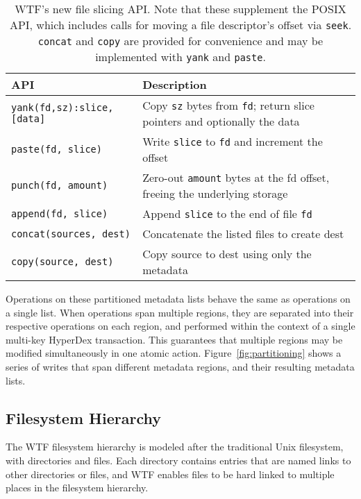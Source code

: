 \documentclass[twocolumn,10pt,letterpaper]{article}
\newcommand{\code}[1]{\texttt{#1}}
\newcommand\T{\rule{0pt}{2.6ex}}       \newcommand\B{\rule[-1.2ex]{0pt}{0pt}}
\begin{document}
\begin{table*}[t]
\centering
\begin{tabular}{ll}
\hline
\T\B API & Description \\
\hline
\T \code{yank(fd,sz):slice,[data]} & Copy \code{sz} bytes from \code{fd}; return
slice pointers and optionally the data \\
\code{paste(fd, slice)} & Write \code{slice} to \code{fd} and increment the
offset\\
\code{punch(fd, amount)} & Zero-out \code{amount} bytes at the fd offset, freeing the underlying storage\\
\B \code{append(fd, slice)} & Append \code{slice} to the end of file \code{fd} \\
\hline
\T \code{concat(sources, dest)} & Concatenate the listed files to create dest \\
\B \code{copy(source, dest)} & Copy source to dest using only the metadata \\
\hline
\end{tabular}
\vspace{-.5\baselineskip}
\caption{WTF's new file slicing API.  Note that these supplement the POSIX API,
which includes calls for moving a file descriptor's offset via \code{seek}.
\code{concat} and \code{copy} are provided for convenience and may be
implemented with \code{yank} and \code{paste}.}
\label{tab:apis}
\vspace{-\baselineskip}
\end{table*}

Operations on these partitioned metadata lists behave the same as operations on
a single list.  When operations span multiple regions, they are separated into
their respective operations on each region, and performed within the context of
a single multi-key HyperDex transaction.  This guarantees that multiple regions
may be modified simultaneously in one atomic action.
Figure~\ref{fig:partitioning} shows a series of writes that span different
metadata regions, and their resulting metadata lists.

\subsection{Filesystem Hierarchy}

The WTF filesystem hierarchy is modeled after the traditional Unix filesystem,
with directories and files.  Each directory contains entries that are
named links to other directories or files, and WTF enables files to be 
hard linked to multiple places in the filesystem hierarchy.
\end{document}
